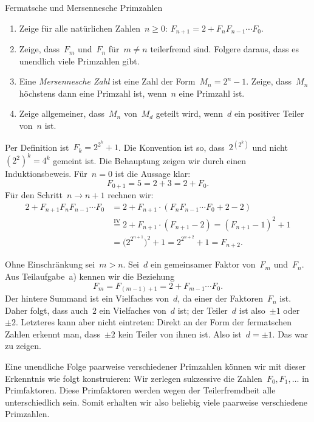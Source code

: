 \documentclass{algblatt}
\begin{document}
\begin{aufgabe}{Fermatsche und Mersennesche Primzahlen}
\begin{enumerate}
\item Zeige für alle natürlichen Zahlen~$n \geq 0$: $F_{n+1} = 2 + F_n F_{n-1}
\cdots F_0$.
\item Zeige, dass~$F_m$ und~$F_n$ für~$m \neq n$ teilerfremd sind. Folgere
daraus, dass es unendlich viele Primzahlen gibt.
\item Eine \emph{Mersennesche Zahl} ist eine Zahl der Form~$M_n = 2^n -
1$. Zeige, dass~$M_n$ höchstens dann eine Primzahl ist, wenn~$n$ eine Primzahl
ist.
\item Zeige allgemeiner, dass~$M_n$ von~$M_d$ geteilt wird, wenn~$d$ ein
positiver Teiler von~$n$ ist.
\end{enumerate}

\begin{loesungE}
\item Per Definition ist~$F_k = 2^{2^k} + 1$. Die Konvention ist so,
dass~$2^{(2^k)}$ und nicht~$(2^2)^k = 4^k$ gemeint ist. Die Behauptung zeigen
wir durch einen Induktionsbeweis. Für~$n = 0$ ist die Aussage klar:
\[ F_{0+1} = 5 = 2 + 3 = 2 + F_0. \]
Für den Schritt~$n \to n + 1$ rechnen wir:
\begin{align*}
  2 + F_{n+1} F_n F_{n-1} \cdots F_0 &=
  2 + F_{n+1} \cdot (F_n F_{n-1} \cdots F_0 + 2 - 2) \\
  &\stackrel{\text{IV}}{=} 2 + F_{n+1} \cdot (F_{n+1} - 2)
  = (F_{n+1} - 1)^2 + 1 \\
  &= \bigl(2^{2^{n+1}}\bigr)^2 + 1
  = 2^{2^{n+2}} + 1
  = F_{n+2}.
\end{align*}

\item Ohne Einschränkung sei~$m > n$. Sei~$d$ ein gemeinsamer Faktor von~$F_m$
und~$F_n$. Aus Teilaufgabe~a) kennen wir die Beziehung
\[ F_m = F_{(m-1)+1} = 2 + F_{m-1} \cdots F_0. \]
Der hintere Summand ist ein Vielfaches von~$d$, da einer der Faktoren~$F_n$
ist. Daher folgt, dass auch~$2$ ein Vielfaches von~$d$ ist; der Teiler~$d$ ist
also~$\pm 1$ oder~$\pm 2$. Letzteres kann aber nicht eintreten: Direkt an der
Form der fermatschen Zahlen erkennt man, dass~$\pm 2$ kein Teiler von ihnen
ist. Also ist~$d = \pm 1$. Das war zu zeigen.

Eine unendliche Folge paarweise verschiedener Primzahlen können wir mit dieser
Erkenntnis wie folgt konstruieren: Wir zerlegen sukzessive die
Zahlen~$F_0,F_1,\ldots$ in Primfaktoren. Diese Primfaktoren werden wegen der
Teilerfremdheit alle unterschiedlich sein. Somit erhalten wir also beliebig
viele paarweise verschiedene Primzahlen.


\end{loesungE}
\end{aufgabe}
\end{document}
